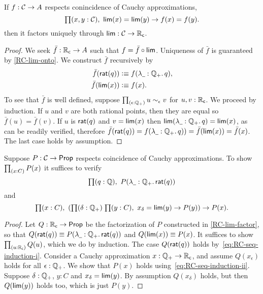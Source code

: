 \begin{lem} \label{RC-lim-factor}
  If $f : \mathcal{C} \to A$ respects conincidence of Cauchy approximations,
  \begin{equation*}
    \prd{x, y : \CAP} \rclim(x) = \rclim(y) \to f(x) = f(y).
  \end{equation*}
  then it factors uniquely through $\mathsf{lim} : \mathcal{C} \to \mathbb{R}_\mathsf{c}$.
\end{lem}

\begin{proof}
  We seek $\bar{f} : \mathbb{R}_\mathsf{c} \to A$ such that $f = \bar{f} \circ \mathsf{lim}$. Uniqueness of
  $\bar{f}$ is guaranteed by \autoref{RC-lim-onto}. We construct $\bar{f}$ recursively by
  \begin{align*}
    \bar{f}(\rcrat(q)) &\defeq f(\lam{\blank : \Qp} q), \\
    \bar{f}(\rclim(x)) &\defeq f(x).
  \end{align*}
  To see that $\bar{f}$ is well defined, suppose $\prd{\epsilon : \Qp} u \sim_\epsilon v$
  for $u, v : \mathbb{R}_\mathsf{c}$. We proceed by induction. If $u$ and $v$ are both rational points, then
  they are equal so $\bar{f}(u) = \bar{f}(v)$. If $u$ is $\mathsf{rat}(q)$ and $v = \mathsf{lim}(x)$
  then $\rclim(\lam{\blank : \Qp} q) = \rclim(x)$, as can be readily verified, therefore
  $\bar{f}(\rcrat(q)) = f(\lam{\blank : \Qp} q)) = \bar{f}(\rclim(x)) = \bar{f}(x)$. The
  last case holds by assumption.
\end{proof}

\begin{lem} \label{RC-seq-induction}
  Suppose $P : \mathcal{C} \to \mathsf{Prop}$ respects coincidence of Cauchy approximations. To show
  $\prd{x : C} P(x)$ it suffices to verify
  \begin{equation*} \label{eq:RC-seq-induction-i}
    \prd{q : \Q} P(\lam{\blank : \Qp} \rcrat(q))
  \end{equation*}
  and
  \begin{equation} \label{eq:RC-seq-induction-ii}
    \prd{x : C}
    \left(\prd{\delta : \Qp}{y : C} x_\delta = \rclim(y) \to P(y) \right)
    \to P(x).
  \end{equation}
\end{lem}

\begin{proof}
  Let $Q : \mathbb{R}_\mathsf{c} \to \mathsf{Prop}$ be the factorization of $P$ constructed in
  \autoref{RC-lim-factor}, so that $Q(\rcrat(q)) \jdeq P(\lam{\blank : \Qp} \rcrat(q))$
  and $Q(\mathsf{lim}(x)) \equiv P(x)$. It suffices to show $\prd{u : \RC} Q(u)$, which we do by
  induction. The case $Q(\mathsf{rat}(q))$ holds by~\eqref{eq:RC-seq-induction-i}. Consider a
  Cauchy approximation $x : \mathbb{Q}_{+} \to \mathbb{R}_\mathsf{c}$, and assume $Q(x_\epsilon)$ holds for all
  $\epsilon : \mathbb{Q}_{+}$. We show that $P(x)$ holds using~\eqref{eq:RC-seq-induction-ii}.
  Suppose $\delta : \mathbb{Q}_{+}$, $y : C$ and $x_\delta = \mathsf{lim}(y)$. By assumption $Q(x_\delta)$
  holds, but then $Q(\mathsf{lim}(y))$ holds too, which is just $P(y)$.
\end{proof}

